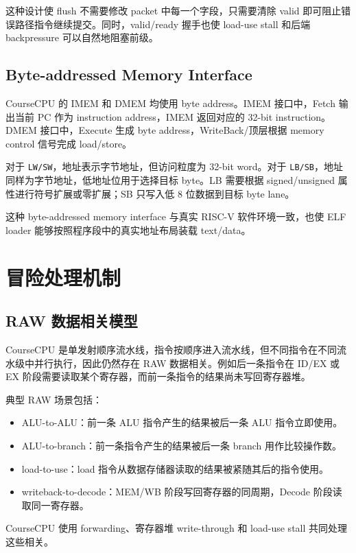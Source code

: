 \documentclass[UTF8,a4paper,12pt]{ctexrep}
\begin{document}
这种设计使 flush 不需要修改 packet 中每一个字段，只需要清除 valid 即可阻止错误路径指令继续提交。同时，valid/ready 握手也使 load-use stall 和后端 backpressure 可以自然地阻塞前级。

\section{Byte-addressed Memory Interface}

CourseCPU 的 IMEM 和 DMEM 均使用 byte address。IMEM 接口中，Fetch 输出当前 PC 作为 instruction address，IMEM 返回对应的 32-bit instruction。DMEM 接口中，Execute 生成 byte address，WriteBack/顶层根据 memory control 信号完成 load/store。

对于 \texttt{LW/SW}，地址表示字节地址，但访问粒度为 32-bit word。对于 \texttt{LB/SB}，地址同样为字节地址，低地址位用于选择目标 byte。LB 需要根据 signed/unsigned 属性进行符号扩展或零扩展；SB 只写入低 8 位数据到目标 byte lane。

这种 byte-addressed memory interface 与真实 RISC-V 软件环境一致，也使 ELF loader 能够按照程序段中的真实地址布局装载 text/data。

\chapter{冒险处理机制}

\section{RAW 数据相关模型}

CourseCPU 是单发射顺序流水线，指令按顺序进入流水线，但不同指令在不同流水级中并行执行，因此仍然存在 RAW 数据相关。例如后一条指令在 ID/EX 或 EX 阶段需要读取某个寄存器，而前一条指令的结果尚未写回寄存器堆。

典型 RAW 场景包括：

\begin{itemize}
  \item ALU-to-ALU：前一条 ALU 指令产生的结果被后一条 ALU 指令立即使用。
  \item ALU-to-branch：前一条指令产生的结果被后一条 branch 用作比较操作数。
  \item load-to-use：load 指令从数据存储器读取的结果被紧随其后的指令使用。
  \item writeback-to-decode：MEM/WB 阶段写回寄存器的同周期，Decode 阶段读取同一寄存器。
\end{itemize}

CourseCPU 使用 forwarding、寄存器堆 write-through 和 load-use stall 共同处理这些相关。
\end{document}
